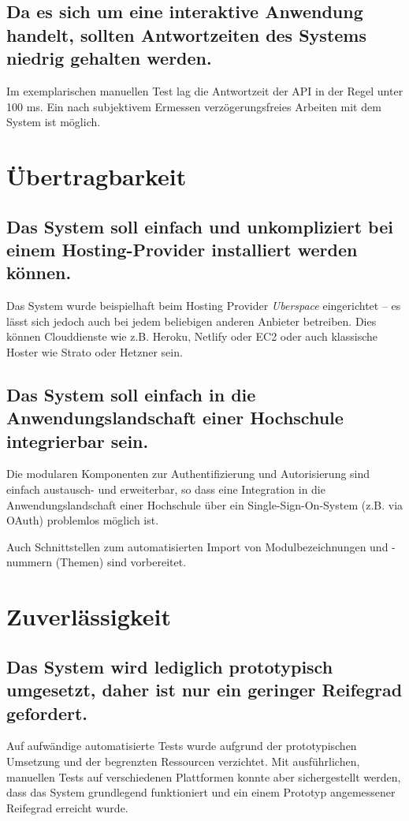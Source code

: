 \documentclass[a4paper,11pt,listof=numbered,glossary=totoc,parskip=half,toc=bib]{scrreprt}
\begin{document}
\begin{appendices}
		\subsection{Da es sich um eine interaktive Anwendung handelt, sollten Antwortzeiten des Systems niedrig gehalten werden.}
		Im exemplarischen manuellen Test lag die Antwortzeit der API in der Regel unter 100 ms. Ein nach subjektivem Ermessen verzögerungsfreies Arbeiten mit dem System ist möglich. 
	
	\section{Übertragbarkeit}

	\subsection{Das System soll einfach und unkompliziert bei einem Hosting-Provider installiert werden können.}
	Das System wurde beispielhaft beim Hosting Provider \textit{Uberspace} eingerichtet -- es lässt sich jedoch auch bei jedem beliebigen anderen Anbieter betreiben. Dies können Clouddienste wie z.B. Heroku, Netlify oder EC2 oder auch klassische Hoster wie Strato oder Hetzner sein.
	
	
	\subsection{Das System soll einfach in die Anwendungslandschaft einer Hochschule integrierbar sein.}
	Die modularen Komponenten zur Authentifizierung und Autorisierung sind einfach austausch- und erweiterbar, so dass eine Integration in die Anwendungslandschaft einer Hochschule über ein Single-Sign-On-System (z.B. via OAuth) problemlos möglich ist. 

	Auch Schnittstellen zum automatisierten Import von Modulbezeichnungen und -nummern (Themen) sind vorbereitet.	
	
	\section{Zuverlässigkeit}
	\subsection{Das System wird lediglich prototypisch umgesetzt, daher ist nur ein geringer Reifegrad gefordert.}
	Auf aufwändige automatisierte Tests wurde aufgrund der prototypischen Umsetzung und der begrenzten Ressourcen verzichtet. Mit ausführlichen, manuellen Tests auf verschiedenen Plattformen konnte aber sichergestellt werden, dass das System grundlegend funktioniert und ein einem Prototyp angemessener Reifegrad erreicht wurde.


\end{appendices}
\end{document}
